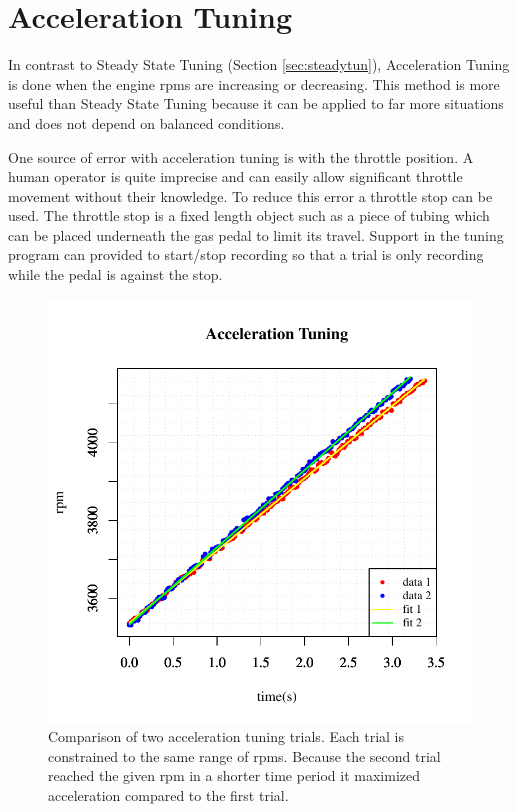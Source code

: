\documentclass{article}
\begin{document}
\section{Acceleration Tuning}
\label{sec:acctun}

In contrast to Steady State Tuning (Section \ref{sec:steadytun}), Acceleration
Tuning is done when the engine rpms are increasing or decreasing.
This method is more useful than Steady State Tuning because it can be
applied to far more situations and does not depend on balanced conditions.

One source of error with acceleration tuning is with the throttle position.
A human operator is quite imprecise and can easily allow significant
throttle movement without their knowledge.
To reduce this error a throttle stop can be used.
The throttle stop is a fixed length object such as a piece of tubing which
can be placed underneath the gas pedal to limit its travel.
Support in the tuning program can provided to start/stop recording so
that a trial is only recording while the pedal is against the stop.

\begin{figure}[!htbp]
\center
\includegraphics[scale=0.8]{msq-accel-4g_52cm_45-65mph-20110627-20:17:43-rtdata-single}
\caption{Comparison of two acceleration tuning trials.
Each trial is constrained to the same range of rpms.
Because the second trial reached the given rpm in a shorter time
period it maximized acceleration compared to the first trial.}
\label{fig:acctun}
\end{figure}
\end{document}
